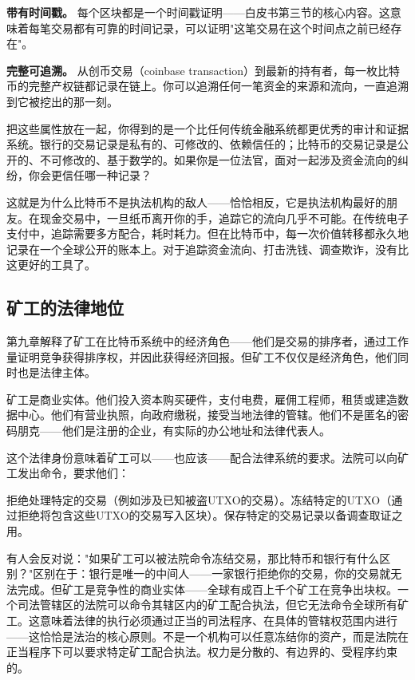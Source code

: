 \documentclass[a4paper,12pt,openany]{ctexbook}
\begin{document}
\textbf{带有时间戳。} 每个区块都是一个时间戳证明——白皮书第三节的核心内容。这意味着每笔交易都有可靠的时间记录，可以证明"这笔交易在这个时间点之前已经存在"。

\textbf{完整可追溯。} 从创币交易（coinbase transaction）到最新的持有者，每一枚比特币的完整产权链都记录在链上。你可以追溯任何一笔资金的来源和流向，一直追溯到它被挖出的那一刻。

把这些属性放在一起，你得到的是一个比任何传统金融系统都更优秀的审计和证据系统。银行的交易记录是私有的、可修改的、依赖信任的；比特币的交易记录是公开的、不可修改的、基于数学的。如果你是一位法官，面对一起涉及资金流向的纠纷，你会更信任哪一种记录？

这就是为什么比特币不是执法机构的敌人——恰恰相反，它是执法机构最好的朋友。在现金交易中，一旦纸币离开你的手，追踪它的流向几乎不可能。在传统电子支付中，追踪需要多方配合，耗时耗力。但在比特币中，每一次价值转移都永久地记录在一个全球公开的账本上。对于追踪资金流向、打击洗钱、调查欺诈，没有比这更好的工具了。


\subsection*{矿工的法律地位}


第九章解释了矿工在比特币系统中的经济角色——他们是交易的排序者，通过工作量证明竞争获得排序权，并因此获得经济回报。但矿工不仅仅是经济角色，他们同时也是法律主体。

矿工是商业实体。他们投入资本购买硬件，支付电费，雇佣工程师，租赁或建造数据中心。他们有营业执照，向政府缴税，接受当地法律的管辖。他们不是匿名的密码朋克——他们是注册的企业，有实际的办公地址和法律代表人。

这个法律身份意味着矿工可以——也应该——配合法律系统的要求。法院可以向矿工发出命令，要求他们：

拒绝处理特定的交易（例如涉及已知被盗UTXO的交易）。冻结特定的UTXO（通过拒绝将包含这些UTXO的交易写入区块）。保存特定的交易记录以备调查取证之用。

有人会反对说："如果矿工可以被法院命令冻结交易，那比特币和银行有什么区别？"区别在于：银行是唯一的中间人——一家银行拒绝你的交易，你的交易就无法完成。但矿工是竞争性的商业实体——全球有成百上千个矿工在竞争出块权。一个司法管辖区的法院可以命令其辖区内的矿工配合执法，但它无法命令全球所有矿工。这意味着法律的执行必须通过正当的司法程序、在具体的管辖权范围内进行——这恰恰是法治的核心原则。不是一个机构可以任意冻结你的资产，而是法院在正当程序下可以要求特定矿工配合执法。权力是分散的、有边界的、受程序约束的。
\end{document}
